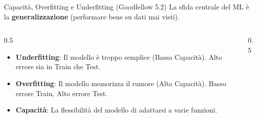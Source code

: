 \documentclass[aspectratio=169, 10pt]{beamer}
\begin{document}
\begin{frame}{Capacità, Overfitting e Underfitting (Goodfellow 5.2)}
    La sfida centrale del ML è la \textbf{generalizzazione} (performare bene su dati mai visti).
    
    \begin{columns}
        \begin{column}{0.5\textwidth}
            \begin{itemize}
                \item \textbf{Underfitting}: Il modello è troppo semplice (Bassa Capacità). Alto errore sia in Train che Test.
                \item \textbf{Overfitting}: Il modello memorizza il rumore (Alta Capacità). Basso errore Train, Alto errore Test.
                \item \textbf{Capacità}: La flessibilità del modello di adattarsi a varie funzioni.
            \end{itemize}
        \end{column}
        \begin{column}{0.5\textwidth}
            \centering
        \end{column}
    \end{columns}
\end{frame}
\end{document}
